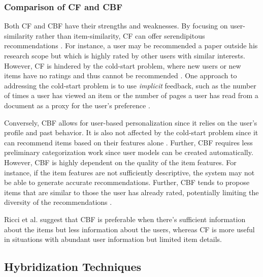 \subsubsection*{Comparison of \acl{CF} and \acl{CBF}}

Both \ac{CF} and \ac{CBF} have their strengths and weaknesses.
By focusing on user-similarity rather than item-similarity, \ac{CF} can offer serendipitous recommendations \cite{BreitingerAcademicLiterature2023}. For instance, a user may be recommended a paper outside his research scope but which is highly rated by other users with similar interests. However, \ac{CF} is hindered by the cold-start problem, where new users or new items have no ratings and thus cannot be recommended \cite{DeyCollaborativeFiltering2021}. One approach to addressing the cold-start problem is to use \emph{implicit} feedback, such as the number of times a user has viewed an item \cite{HuCollaborativeFiltering2008} or the number of pages a user has read from a document as a proxy for the user's preference \cite{YangCARESRankingoriented2009}.

Conversely, \ac{CBF} allows for user-based personalization since it relies on the user's profile and past behavior. It is also not affected by the cold-start problem since it can recommend items based on their features alone \cite{DeyCollaborativeFiltering2021}. Further, \ac{CBF} requires less preliminary categorization work \cite{BreitingerAcademicLiterature2023} since user models can be created automatically. However, \ac{CBF} is highly dependent on the quality of the item features. For instance, if the item features are not sufficiently descriptive, the system may not be able to generate accurate recommendations. Further, \ac{CBF} tends to propose items that are similar to those the user has already rated, potentially limiting the diversity of the recommendations \cite{DeyCollaborativeFiltering2021,BurkeHybridRecommender2002}.

Ricci et al. \cite{RicciRecommenderSystems2015} suggest that \ac{CBF} is preferable when there's sufficient information about the items but less information about the users, whereas \ac{CF} is more useful in situations with abundant user information but limited item details.


\subsection{Hybridization Techniques} \label{sec:hybridization-techniques}

